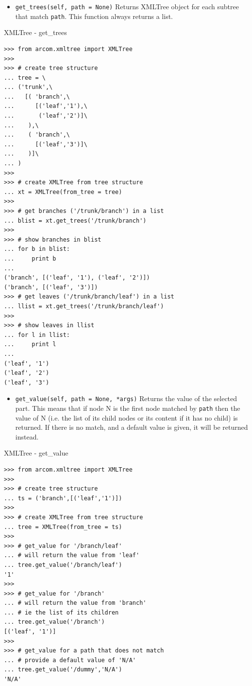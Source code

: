 \documentclass{article}
\begin{document}
\begin{flushleft}
\begin{itemize}
{    \begin{itemize}
      \item{ \verb$get_trees(self, path = None)$ \linebreak
      Returns XMLTree object for each subtree that match \verb$path$.
      This function always returns a list.
      }
    \end{itemize}

    \begin{example}
      \caption{XMLTree - get\_trees}\label{xtgettrees}
\begin{verbatim}
>>> from arcom.xmltree import XMLTree
>>> 
>>> # create tree structure
... tree = \
... ('trunk',\
...   [( 'branch',\
...      [('leaf','1'),\
...       ('leaf','2')]\
...    ),\
...    ( 'branch',\
...      [('leaf','3')]\
...    )]\
... )
>>> 
>>> # create XMLTree from tree structure
... xt = XMLTree(from_tree = tree)
>>> 
>>> # get branches ('/trunk/branch') in a list
... blist = xt.get_trees('/trunk/branch')
>>> 
>>> # show branches in blist
... for b in blist:
...     print b
... 
('branch', [('leaf', '1'), ('leaf', '2')])
('branch', [('leaf', '3')])
>>> # get leaves ('/trunk/branch/leaf') in a list
... llist = xt.get_trees('/trunk/branch/leaf')
>>> 
>>> # show leaves in llist
... for l in llist:
...     print l
... 
('leaf', '1')
('leaf', '2')
('leaf', '3')
\end{verbatim}
    \end{example}

    \begin{itemize}
      \item{ \verb$get_value(self, path = None, *args)$ \linebreak
      Returns the value of the selected part. This means that if node N is
      the first node matched by \verb$path$ then the value of N (i.e. the list of
      its child nodes or its content if it has no child) is returned. If there is no match, 
      and a default value is given, it will be returned instead.
      }
    \end{itemize}

    \begin{example}
      \caption{XMLTree - get\_value}\label{xtgetval}
\begin{verbatim}
>>> from arcom.xmltree import XMLTree
>>> 
>>> # create tree structure
... ts = ('branch',[('leaf','1')])
>>> 
>>> # create XMLTree from tree structure
... tree = XMLTree(from_tree = ts)
>>> 
>>> # get_value for '/branch/leaf'
... # will return the value from 'leaf'
... tree.get_value('/branch/leaf')
'1'
>>> 
>>> # get_value for '/branch'
... # will return the value from 'branch'
... # ie the list of its children
... tree.get_value('/branch')
[('leaf', '1')]
>>> 
>>> # get_value for a path that does not match
... # provide a default value of 'N/A'
... tree.get_value('/dummy','N/A')
'N/A'
\end{verbatim}
    \end{example}

}
\end{itemize}
\end{flushleft}
\end{document}
